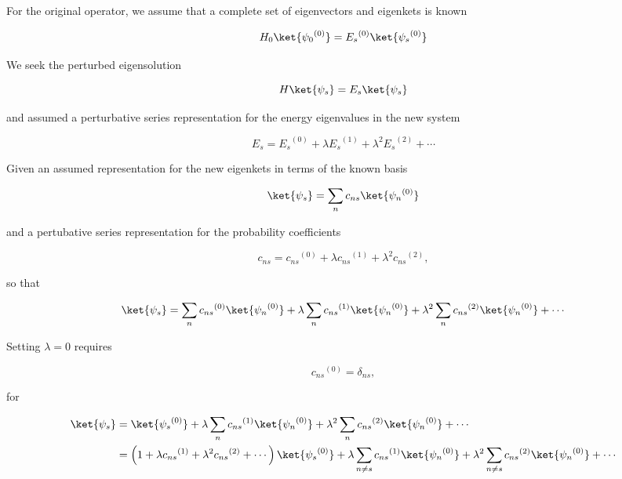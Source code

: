For the original operator, we assume that a complete set of eigenvectors and eigenkets is known

\begin{equation}\label{eqn:qmTwoL4:30}
H_0 \ket{{\psi_0}^{(0)}} = {E_s}^{(0)} \ket{{\psi_s}^{(0)}}
\end{equation}

We seek the perturbed eigensolution

\begin{equation}\label{eqn:qmTwoL4:50}
H \ket{\psi_s} = E_s \ket{\psi_s}
\end{equation}

and assumed a perturbative series representation for the energy eigenvalues in the new system

\begin{equation}\label{eqn:qmTwoL4:70}
E_s = {E_s}^{(0)} + \lambda {E_s}^{(1)} + \lambda^2 {E_s}^{(2)} + \cdots
\end{equation}

Given an assumed representation for the new eigenkets in terms of the known basis

\begin{equation}\label{eqn:qmTwoL4:90}
\ket{\psi_s} = \sum_n c_{ns} \ket{{\psi_n}^{(0)}} 
\end{equation}

and a pertubative series representation for the probability coefficients

\begin{equation}\label{eqn:qmTwoL4:110}
c_{ns} = {c_{ns}}^{(0)} + \lambda {c_{ns}}^{(1)} + \lambda^2 {c_{ns}}^{(2)},
\end{equation}

so that 

\begin{equation}\label{eqn:qmTwoL4:130}
\ket{\psi_s} = 
\sum_n {c_{ns}}^{(0)} \ket{{\psi_n}^{(0)}} 
+
\lambda
\sum_n {c_{ns}}^{(1)} \ket{{\psi_n}^{(0)}} 
+ 
\lambda^2
\sum_n {c_{ns}}^{(2)} \ket{{\psi_n}^{(0)}} 
+ \cdots
\end{equation}

Setting $\lambda = 0$ requires 

\begin{equation}\label{eqn:qmTwoL4:150}
{c_{ns}}^{(0)} = \delta_{ns},
\end{equation}

for

\begin{equation}\label{eqn:qmTwoL4:170}
\begin{aligned}
\ket{\psi_s} 
&= 
\ket{{\psi_s}^{(0)}} 
+
\lambda
\sum_n {c_{ns}}^{(1)} \ket{{\psi_n}^{(0)}} 
+ 
\lambda^2
\sum_n {c_{ns}}^{(2)} \ket{{\psi_n}^{(0)}} 
+ \cdots \\
&=
\left(
1 
+ \lambda {c_{ns}}^{(1)} 
+ \lambda^2 {c_{ns}}^{(2)} 
+ \cdots
\right)
\ket{{\psi_s}^{(0)}} 
+ 
\lambda
\sum_{n \ne s} {c_{ns}}^{(1)} \ket{{\psi_n}^{(0)}} 
+
\lambda^2
\sum_{n \ne s} {c_{ns}}^{(2)} \ket{{\psi_n}^{(0)}} 
+ \cdots
\end{aligned}
\end{equation}

